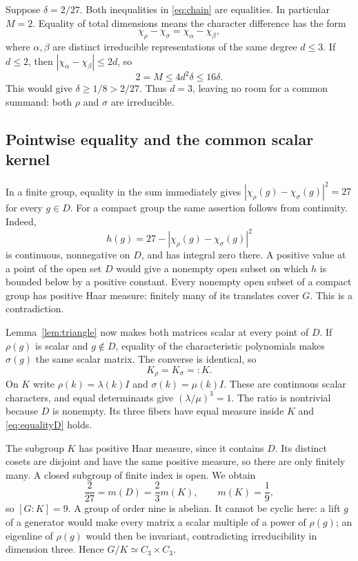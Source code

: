 \documentclass[11pt]{article}
\theoremstyle{definition}\newtheorem{definition}[theorem]{Definition}
\theoremstyle{remark}\newtheorem{remark}[theorem]{Remark}
\begin{document}
Suppose $\delta=2/27$. Both inequalities in \eqref{eq:chain} are equalities. In particular $M=2$. Equality of total dimensions means the character difference has the form
\[
 \chi_\rho-\chi_\sigma=\chi_\alpha-\chi_\beta,
\]
where $\alpha,\beta$ are distinct irreducible representations of the same degree $d\le3$. If $d\le2$, then $|\chi_\alpha-\chi_\beta|\le2d$, so
\[
 2=M\le4d^2\delta\le16\delta.
\]
This would give $\delta\ge1/8>2/27$. Thus $d=3$, leaving no room for a common summand: both $\rho$ and $\sigma$ are irreducible.

\subsection{Pointwise equality and the common scalar kernel}

In a finite group, equality in the sum immediately gives
$|\chi_\rho(g)-\chi_\sigma(g)|^2=27$ for every $g\in D$. For a compact group the same assertion follows from continuity. Indeed,
\[
 h(g)=27-|\chi_\rho(g)-\chi_\sigma(g)|^2
\]
is continuous, nonnegative on $D$, and has integral zero there. A positive value at a point of the open set $D$ would give a nonempty open subset on which $h$ is bounded below by a positive constant. Every nonempty open subset of a compact group has positive Haar measure: finitely many of its translates cover $G$. This is a contradiction.

Lemma~\ref{lem:triangle} now makes both matrices scalar at every point of $D$. If $\rho(g)$ is scalar and $g\notin D$, equality of the characteristic polynomials makes $\sigma(g)$ the same scalar matrix. The converse is identical, so
\[
 K_\rho=K_\sigma=:K.
\]
On $K$ write $\rho(k)=\lambda(k)I$ and $\sigma(k)=\mu(k)I$. These are continuous scalar characters, and equal determinants give $(\lambda/\mu)^3=1$. The ratio is nontrivial because $D$ is nonempty. Its three fibers have equal measure inside $K$ and \eqref{eq:equalityD} holds.

The subgroup $K$ has positive Haar measure, since it contains $D$. Its distinct cosets are disjoint and have the same positive measure, so there are only finitely many. A closed subgroup of finite index is open. We obtain
\[
 \frac{2}{27}=m(D)=\frac23m(K),\qquad m(K)=\frac19,
\]
so $[G:K]=9$. A group of order nine is abelian. It cannot be cyclic here: a lift $g$ of a generator would make every matrix a scalar multiple of a power of $\rho(g)$; an eigenline of $\rho(g)$ would then be invariant, contradicting irreducibility in dimension three. Hence $G/K\simeq C_3\times C_3$.
\end{document}
